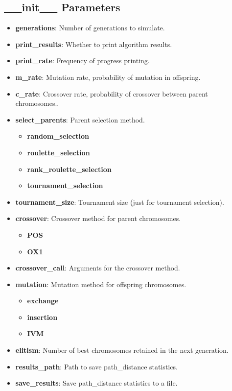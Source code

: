 \documentclass[12pt]{article}
\begin{document}
\begin{enumerate}
\subsection{\_\_init\_\_ Parameters}
\label{annex:initparameters}
\begin{itemize}
    \item \textbf{generations}: Number of generations to simulate.
    \item \textbf{print\_results}: Whether to print algorithm results.
    \item \textbf{print\_rate}: Frequency of progress printing.
    \item \textbf{m\_rate}: Mutation rate, probability of mutation in offspring.
    \item \textbf{c\_rate}: Crossover rate, probability of crossover between parent chromosomes..
    \item \textbf{select\_parents}: Parent selection method.
        \begin{itemize}
            \item \textbf{random\_selection}
            \item \textbf{roulette\_selection}
            \item \textbf{rank\_roulette\_selection}
            \item \textbf{tournament\_selection}
        \end{itemize}
    \item \textbf{tournament\_size}: Tournament size (just for tournament selection).
    \item \textbf{crossover}: Crossover method for parent chromosomes.
        \begin{itemize}
            \item \textbf{POS}
            \item \textbf{OX1}
        \end{itemize}
    \item \textbf{crossover\_call}: Arguments for the crossover method.
    \item \textbf{mutation}: Mutation method for offspring chromosomes.
        \begin{itemize}
            \item \textbf{exchange}
            \item \textbf{insertion}
            \item \textbf{IVM}
        \end{itemize}
    \item \textbf{elitism}: Number of best chromosomes retained in the next generation.
    \item \textbf{results\_path}: Path to save path\_distance statistics.
    \item \textbf{save\_results}: Save path\_distance statistics to a file.
\end{itemize}

\end{enumerate}
\end{document}
